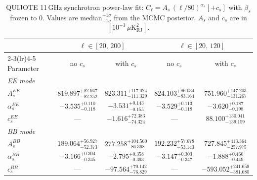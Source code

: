 \begin{table}[htbp]
\centering
\caption{QUIJOTE 11\,GHz synchrotron power-law fit: $C_\ell = A_s\,(\ell/80)^{\alpha_s} [+ c_s]$ with $\beta_s$ frozen to 0. Values are median$^{+1\sigma}_{-1\sigma}$ from the MCMC posterior. $A_s$ and $c_s$ are in $[10^{-3}\,\mu\mathrm{K}^2_\mathrm{RJ}]$.}
\label{tab:sync_11ghz}
\begin{tabular}{lcccc}
\toprule
& \multicolumn{2}{c}{$\ell \in [20,\,200]$} & \multicolumn{2}{c}{$\ell \in [20,\,120]$} \\
\cmidrule(lr){2-3}\cmidrule(lr){4-5}
Parameter & no $c_s$ & with $c_s$ & no $c_s$ & with $c_s$ \\
\midrule
\multicolumn{5}{l}{\textit{EE mode}} \\
$A_s^{EE}$ & $819.897^{+82.947}_{-82.252}$ & $823.311^{+117.024}_{-111.329}$ & $824.103^{+86.034}_{-83.164}$ & $751.960^{+147.203}_{-131.267}$ \\
$\alpha_s^{EE}$ & $-3.535^{+0.110}_{-0.118}$ & $-3.531^{+0.143}_{-0.155}$ & $-3.529^{+0.113}_{-0.118}$ & $-3.620^{+0.187}_{-0.198}$ \\
$c_s^{EE}$ & \multicolumn{1}{c}{---} & $-1.616^{+72.383}_{-74.324}$ & \multicolumn{1}{c}{---} & $88.100^{+130.041}_{-139.159}$ \\
\midrule
\multicolumn{5}{l}{\textit{BB mode}} \\
$A_s^{BB}$ & $189.064^{+56.927}_{-52.373}$ & $277.258^{+104.560}_{-86.368}$ & $192.232^{+57.678}_{-53.143}$ & $727.845^{+413.364}_{-257.975}$ \\
$\alpha_s^{BB}$ & $-3.166^{+0.304}_{-0.345}$ & $-2.795^{+0.358}_{-0.393}$ & $-3.147^{+0.303}_{-0.347}$ & $-1.888^{+0.460}_{-0.449}$ \\
$c_s^{BB}$ & \multicolumn{1}{c}{---} & $-97.564^{+70.142}_{-76.829}$ & \multicolumn{1}{c}{---} & $-593.052^{+241.659}_{-381.680}$ \\
\bottomrule
\end{tabular}
\end{table}
